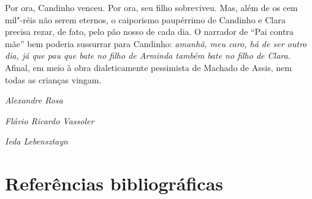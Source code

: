 Por ora, Candinho venceu. Por ora, seu filho sobreviveu. Mas, além de os
cem mil"-réis não serem eternos, o caiporismo paupérrimo de Candinho e
Clara precisa rezar, de fato, pelo pão nosso de cada dia. O narrador de
``Pai contra mãe'' bem poderia sussurrar para Candinho: \emph{amanhã,
meu caro, há de ser outro dia, já que pau que bate no filho de Arminda
também bate no filho de Clara.} Afinal, em meio à obra dialeticamente
pessimista de Machado de Assis, nem todas as crianças vingam.

\smallskip

\begin{flushright}
\emph{Alexandre Rosa}

\emph{Flávio Ricardo Vassoler}

\emph{Ieda Lebensztayn}
\end{flushright}

\section{Referências bibliográficas}

